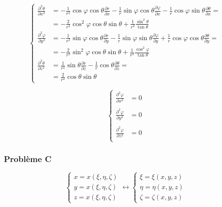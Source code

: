 \documentclass
[
a4paper,                      %
twoside,					  %
12pt,                         %
abstract,		      %
fleqn,                        %
]
{scrartcl} %
\begin{document}
\begin{description}
\begin{equation}
\begin{cases}
\frac{\partial^{2} \theta}{\partial x^{2}}&=-\frac{1}{r^{2}}\cos{\varphi}\cos{\theta}\frac{\partial r}{\partial x}-\frac{1}{r}\sin{\varphi}\cos{\theta}\frac{\partial \varphi}{\partial x}-\frac{1}{r}\cos{\varphi}\sin{\theta}\frac{\partial \theta}{\partial x}=\\
&=-\frac{2}{r^{2}}\cos^{2}{\varphi}\cos{\theta}\sin{\theta}+\frac{1}{r^{2}}\frac{\sin^{2}{\theta}}{\tan{\theta}}\\
\frac{\partial^{2} \varphi}{\partial y^{2}}&=-\frac{1}{r^{2}}\sin{\varphi}\cos{\theta}\frac{\partial r}{\partial y}-\frac{1}{r}\sin{\varphi}\sin{\theta}\frac{\partial \varphi}{\partial y}+\frac{1}{r}\cos{\varphi}\cos{\theta}\frac{\partial \theta}{\partial y}=\\
&=-\frac{2}{r^{2}}\sin^{2}{\varphi}\cos{\theta}\sin{\theta}+\frac{1}{r^{2}}\frac{\cos^{2}{\varphi}}{\tan{\theta}}\\
\frac{\partial^{2}\theta}{\partial z^{2}}&=\frac{1}{r^{2}}\sin{\theta}\frac{\partial r}{\partial z}-\frac{1}{r}\cos{\theta}\frac{\partial\theta}{\partial z}=\\
&=\frac{2}{r^{2}}\cos{\theta}\sin{\theta}
\end{cases}
\end{equation}

\begin{equation}
\begin{cases}
\frac{\partial^{2} \varphi}{\partial x^{2}}&=0\\&\\
\frac{\partial^{2} \varphi}{\partial y^{2}}&=0\\&\\
\frac{\partial^{2} \varphi}{\partial z^{2}}&=0\\
\end{cases}
\end{equation}

\end{description}

\subsubsection{Probl\`eme C}

\begin{equation}
\begin{cases}
x=x\left(\xi,\eta,\zeta\right)\\
y=x\left(\xi,\eta,\zeta\right)\\
z=x\left(\xi,\eta,\zeta\right)
\end{cases}\longleftrightarrow\begin{cases}
\xi=\xi\left(x,y,z\right)\\
\eta=\eta\left(x,y,z\right)\\
\zeta=\zeta\left(x,y,z\right)
\end{cases}
\end{equation}
\end{document}
